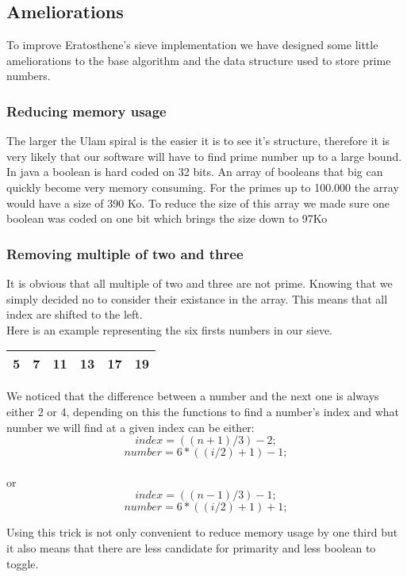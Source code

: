 \subsection{Ameliorations}

To improve Eratosthene's sieve implementation we have designed some little ameliorations to the base algorithm and the data structure used to store prime numbers.

\subsubsection{Reducing memory usage}
The larger the Ulam spiral is the easier it is to see it's structure, therefore it is very likely that our software will have to find prime number up to a large bound.\\In java a boolean is hard coded on 32 bits. An array of booleans that big can quickly become very memory consuming. For the primes up to 100.000 the array would have a size of 390 Ko. To reduce the size of this array we made sure one boolean was coded on one bit which brings the size down to 97Ko

\subsubsection{Removing multiple of two and three }
It is obvious that all multiple of two and three are not prime. Knowing that we simply decided no to consider their existance in the array. This means that all index are shifted to the left.\\ Here is an example representing the six firsts numbers in our sieve.

\begin{center}
   \begin{tabular}{ |*{6}{c|} }
     \hline
     5 & 7 & 11 & 13 & 17 & 19 \\ \hline
     
   \end{tabular}
\end{center}  

 We noticed that the difference between a number and the next one is always either 2 or 4, depending on this the functions to find a number's index and what number we will find at a given index can be either: $$index = ((n + 1) / 3) - 2;$$ $$number = 6 * ((i / 2) + 1) - 1;$$ \\or $$index = ((n - 1) / 3) - 1;$$ $$number = 6 * ((i / 2) + 1) + 1;$$

Using this trick is not only convenient to reduce memory usage by one third but it also means that there are less candidate for primarity and less boolean to toggle. 


